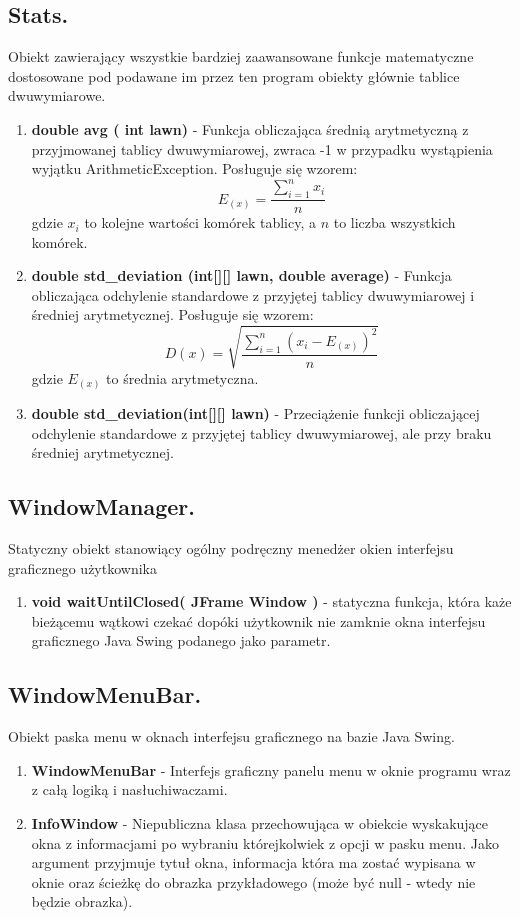 \documentclass[a4paper]{article}
\begin{document}
\subsection{Stats.}
Obiekt zawierający wszystkie bardziej zaawansowane funkcje matematyczne dostosowane pod podawane im przez ten program obiekty głównie tablice dwuwymiarowe.
\begin{enumerate}
     \item \textbf{double avg ( int  lawn) } - Funkcja obliczająca średnią arytmetyczną z przyjmowanej tablicy dwuwymiarowej, zwraca -1 w przypadku wystąpienia wyjątku ArithmeticException.  Posługuje się wzorem:
          \[E_{(x)} = \frac{\sum_{i=1}^n x_i}{n}\]
          gdzie $x_i$ to kolejne wartości komórek tablicy, a $n$ to liczba wszystkich komórek.
	\item \textbf{double std\_deviation (int[][] lawn, double average)} - Funkcja obliczająca odchylenie standardowe z przyjętej tablicy dwuwymiarowej i średniej arytmetycznej.  Posługuje się wzorem:
          \[D(x) = \sqrt{\frac{\sum_{i=1}^n (x_i - E_{(x)})^2 }{n}}\]
          gdzie \(E_{(x)}\) to średnia arytmetyczna.
	\item \textbf{double std\_deviation(int[][] lawn) } - Przeciążenie funkcji obliczającej odchylenie standardowe z przyjętej tablicy dwuwymiarowej, ale przy braku średniej arytmetycznej.
\end{enumerate}


\subsection{WindowManager.}
Statyczny obiekt stanowiący ogólny podręczny menedżer okien interfejsu graficznego użytkownika
\begin{enumerate}
    \item \textbf{void waitUntilClosed( JFrame Window )} - statyczna funkcja, która każe bieżącemu wątkowi czekać dopóki użytkownik nie zamknie okna interfejsu graficznego Java Swing podanego jako parametr.
\end{enumerate}

\subsection{WindowMenuBar.}
Obiekt paska menu w oknach interfejsu graficznego na bazie Java Swing.
\begin{enumerate}
    	\item \textbf{WindowMenuBar} - Interfejs graficzny panelu menu w oknie programu wraz z całą logiką i nasłuchiwaczami.
	\item \textbf{InfoWindow} - Niepubliczna klasa przechowująca w obiekcie wyskakujące okna z informacjami po wybraniu którejkolwiek z opcji w pasku menu. Jako argument przyjmuje tytuł okna, informacja która ma zostać wypisana w oknie oraz ścieżkę do obrazka przykładowego (może być null - wtedy nie będzie obrazka). 
\end{enumerate}
\end{document}
